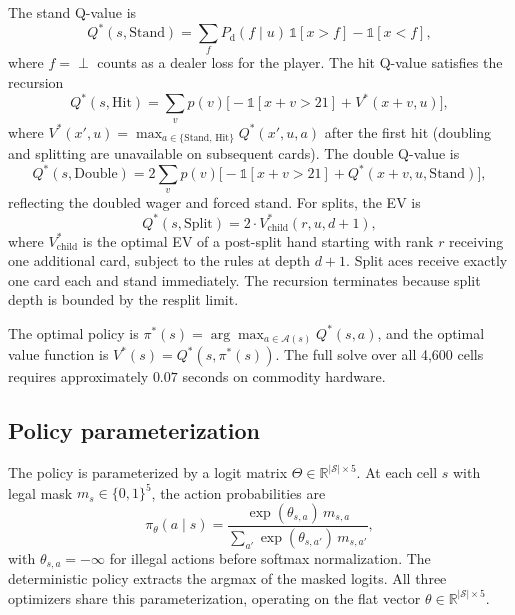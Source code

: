 \documentclass[12pt]{article}
\begin{document}
The stand Q-value is
\begin{equation}
  Q^*(s, \text{Stand}) = \sum_f P_\mathrm{d}(f \mid u)\,\mathbb{1}[x > f] - \mathbb{1}[x < f],
\end{equation}
where $f = \perp$ counts as a dealer loss for the player.
The hit Q-value satisfies the recursion
\begin{equation}
  Q^*(s, \text{Hit}) = \sum_{v} p(v)\bigl[-\mathbb{1}[x{+}v>21] + V^*(x{+}v, u)\bigr],
\end{equation}
where $V^*(x', u) = \max_{a \in \{\text{Stand, Hit}\}} Q^*(x', u, a)$ after the first
hit (doubling and splitting are unavailable on subsequent cards).
The double Q-value is
\begin{equation}
  Q^*(s, \text{Double}) = 2\sum_v p(v)\bigl[-\mathbb{1}[x{+}v>21] + Q^*(x{+}v, u, \text{Stand})\bigr],
\end{equation}
reflecting the doubled wager and forced stand.
For splits, the EV is
\begin{equation}
  Q^*(s, \text{Split}) = 2 \cdot V^*_\mathrm{child}(r, u, d+1),
\end{equation}
where $V^*_\mathrm{child}$ is the optimal EV of a post-split hand starting with rank $r$
receiving one additional card, subject to the rules at depth $d+1$.  Split aces receive
exactly one card each and stand immediately.  The recursion terminates because split
depth is bounded by the resplit limit.

The optimal policy is $\pi^*(s) = \arg\max_{a \in \mathcal{A}(s)} Q^*(s, a)$, and the
optimal value function is $V^*(s) = Q^*(s, \pi^*(s))$.  The full solve over all 4,600
cells requires approximately $0.07$ seconds on commodity hardware.

\subsection{Policy parameterization}

The policy is parameterized by a logit matrix $\Theta \in \mathbb{R}^{|\mathcal{S}| \times 5}$.
At each cell $s$ with legal mask $m_s \in \{0,1\}^5$, the action probabilities are
\begin{equation}
  \pi_\theta(a \mid s) = \frac{\exp(\theta_{s,a})\,m_{s,a}}{\sum_{a'} \exp(\theta_{s,a'})\,m_{s,a'}},
  \label{eq:softmax}
\end{equation}
with $\theta_{s,a} = -\infty$ for illegal actions before softmax normalization.
The deterministic policy extracts the argmax of the masked logits.  All three
optimizers share this parameterization, operating on the flat vector $\theta
\in \mathbb{R}^{|\mathcal{S}| \times 5}$.
\end{document}
